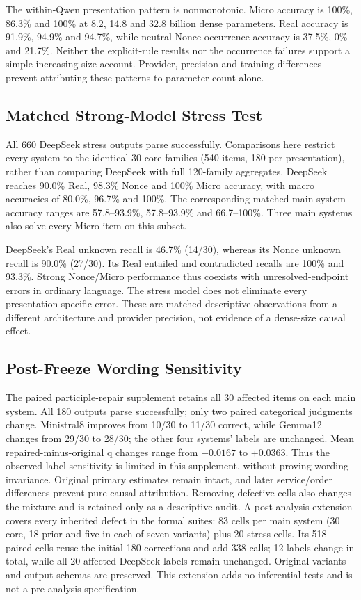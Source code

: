 \documentclass[sigconf,anonymous,review]{acmart}
\begin{document}
The within-Qwen presentation pattern is nonmonotonic. Micro accuracy is 100\%, 86.3\% and 100\% at 8.2, 14.8 and 32.8 billion dense parameters. Real accuracy is 91.9\%, 94.9\% and 94.7\%, while neutral Nonce occurrence accuracy is 37.5\%, 0\% and 21.7\%. Neither the explicit-rule results nor the occurrence failures support a simple increasing size account. Provider, precision and training differences prevent attributing these patterns to parameter count alone.

\subsection{Matched Strong-Model Stress Test}
All 660 DeepSeek stress outputs parse successfully. Comparisons here restrict every system to the identical 30 core families (540 items, 180 per presentation), rather than comparing DeepSeek with full 120-family aggregates. DeepSeek reaches 90.0\% Real, 98.3\% Nonce and 100\% Micro accuracy, with macro accuracies of 80.0\%, 96.7\% and 100\%. The corresponding matched main-system accuracy ranges are 57.8--93.9\%, 57.8--93.9\% and 66.7--100\%. Three main systems also solve every Micro item on this subset.

DeepSeek's Real unknown recall is 46.7\% (14/30), whereas its Nonce unknown recall is 90.0\% (27/30). Its Real entailed and contradicted recalls are 100\% and 93.3\%. Strong Nonce/Micro performance thus coexists with unresolved-endpoint errors in ordinary language. The stress model does not eliminate every presentation-specific error. These are matched descriptive observations from a different architecture and provider precision, not evidence of a dense-size causal effect.

\subsection{Post-Freeze Wording Sensitivity}
The paired participle-repair supplement retains all 30 affected items on each main system. All 180 outputs parse successfully; only two paired categorical judgments change. Ministral8 improves from 10/30 to 11/30 correct, while Gemma12 changes from 29/30 to 28/30; the other four systems' labels are unchanged. Mean repaired-minus-original q changes range from $-0.0167$ to $+0.0363$. Thus the observed label sensitivity is limited in this supplement, without proving wording invariance. Original primary estimates remain intact, and later service/order differences prevent pure causal attribution. Removing defective cells also changes the mixture and is retained only as a descriptive audit. A post-analysis extension covers every inherited defect in the formal suites: 83 cells per main system (30 core, 18 prior and five in each of seven variants) plus 20 stress cells. Its 518 paired cells reuse the initial 180 corrections and add 338 calls; 12 labels change in total, while all 20 affected DeepSeek labels remain unchanged. Original variants and output schemas are preserved. This extension adds no inferential tests and is not a pre-analysis specification.
\end{document}
